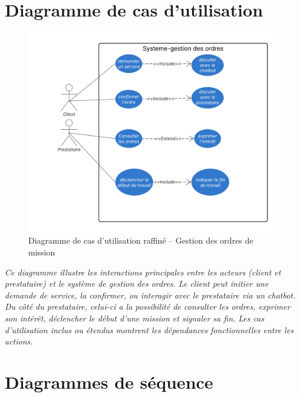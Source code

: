 \section*{Diagramme de cas d'utilisation}
    \begin{figure}[H]
    \centering
    \includegraphics[width=0.85\linewidth]{figures/diagramme de cas d'utilisation gestion ordres.png}
\caption{Diagramme de cas d'utilisation raffiné – Gestion des ordres de mission}
\end{figure}

\textit{Ce diagramme illustre les interactions principales entre les acteurs (client et prestataire) et le système de gestion des ordres. Le client peut initier une demande de service, la confirmer, ou interagir avec le prestataire via un chatbot. Du côté du prestataire, celui-ci a la possibilité de consulter les ordres, exprimer son intérêt, déclencher le début d'une mission et signaler sa fin. Les cas d'utilisation inclus ou étendus montrent les dépendances fonctionnelles entre les actions.}


\section*{Diagrammes de séquence}
